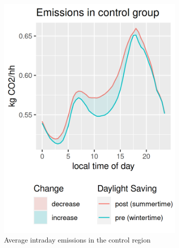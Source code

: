 \begin{figure}[ht]
    \centering
    \begin{subfigure}[t]{0.45\textwidth} 
        \includegraphics[width=\textwidth]{Images/intraday/co2_kg_per_capita/by-treated/control/hr_local-filled.png}
        \caption{Average intraday emissions in the control region}
        \label{fig:intraday co2 control}
    \end{subfigure}
    \hfill 
    \begin{subfigure}[t]{0.45\textwidth} 

\end{subfigure}
\end{figure}

